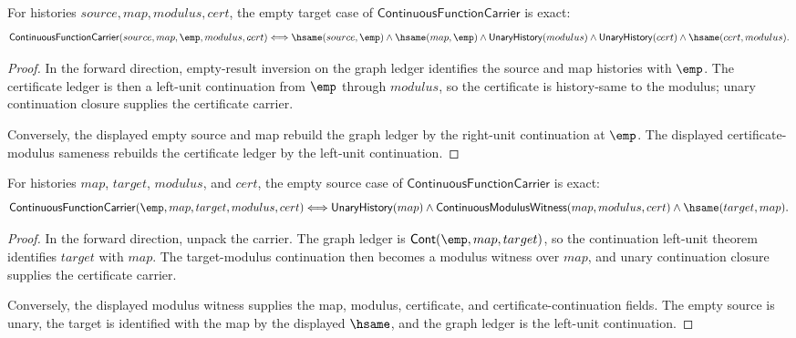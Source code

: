 \begin{theorem}
\label{thm:continuous-function-carrier-empty-target-iff}
For histories $source,map,modulus,cert$, the empty target case of
$\mathsf{ContinuousFunctionCarrier}$ is exact:
$$
\mathsf{ContinuousFunctionCarrier}(source,map,\emp,modulus,cert)
\Longleftrightarrow
\hsame(source,\emp)\land\hsame(map,\emp)\land
\mathsf{UnaryHistory}(modulus)\land\mathsf{UnaryHistory}(cert)\land
\hsame(cert,modulus).
$$
\end{theorem}
\begin{proof}
In the forward direction, empty-result inversion on the graph ledger identifies
the source and map histories with $\emp$. The certificate ledger is then a
left-unit continuation from $\emp$ through $modulus$, so the certificate is
history-same to the modulus; unary continuation closure supplies the
certificate carrier.

Conversely, the displayed empty source and map rebuild the graph ledger by the
right-unit continuation at $\emp$. The displayed certificate-modulus sameness
rebuilds the certificate ledger by the left-unit continuation.
\end{proof}

\begin{theorem}
\label{thm:continuous-function-carrier-empty-source-iff}
For histories $map$, $target$, $modulus$, and $cert$, the empty source case of
$\mathsf{ContinuousFunctionCarrier}$ is exact:
$$
\mathsf{ContinuousFunctionCarrier}(\emp,map,target,modulus,cert)
\Longleftrightarrow
\mathsf{UnaryHistory}(map)\land
\mathsf{ContinuousModulusWitness}(map,modulus,cert)\land
\hsame(target,map).
$$
\end{theorem}
\begin{proof}
In the forward direction, unpack the carrier. The graph ledger is
$\mathsf{Cont}(\emp,map,target)$, so the continuation left-unit theorem
identifies $target$ with $map$. The target-modulus continuation then becomes a
modulus witness over $map$, and unary continuation closure supplies the
certificate carrier.

Conversely, the displayed modulus witness supplies the map, modulus,
certificate, and certificate-continuation fields. The empty source is unary,
the target is identified with the map by the displayed $\hsame$, and the graph
ledger is the left-unit continuation.
\end{proof}

